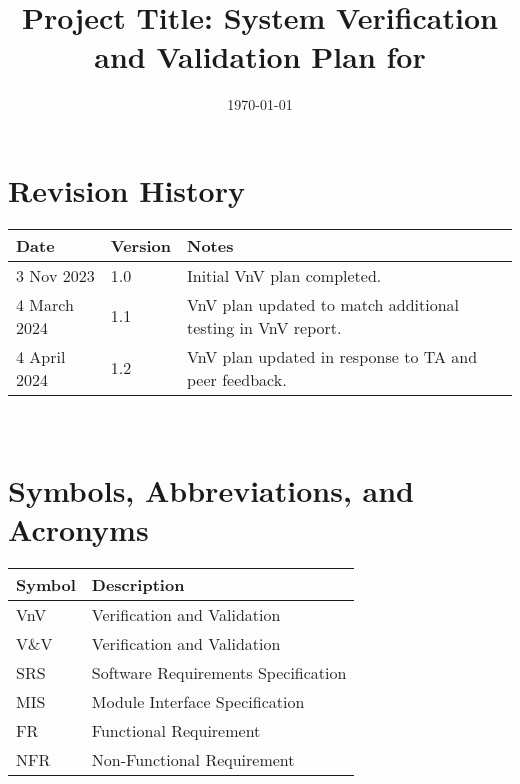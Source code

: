 \documentclass[12pt, titlepage]{article}
\begin{document}
\title{Project Title: System Verification and Validation Plan for \progname{}} 
\author{\authname}
\date{\today}
	
\maketitle


\section*{Revision History}

\begin{tabularx}{\textwidth}{p{3cm}p{2cm}X}
\toprule {\bf Date} & {\bf Version} & {\bf Notes}\\
\midrule
3 Nov 2023 & 1.0 & Initial VnV plan completed. \\
4 March 2024 & 1.1 & VnV plan updated to match additional testing in VnV report. \\
4 April 2024 & 1.2 & VnV plan updated in response to TA and peer feedback. \\
\bottomrule
\end{tabularx}

~\\

\newpage

\tableofcontents

\listoftables

\newpage

\section{Symbols, Abbreviations, and Acronyms}

\renewcommand{\arraystretch}{1.2}
\begin{tabular}[H]{l l}
  \toprule		
  \textbf{Symbol} & \textbf{Description}\\
  \midrule 
  VnV & Verification and Validation\\
  V\&V & Verification and Validation\\
  SRS & Software Requirements Specification\\
  MIS & Module Interface Specification \\
  FR & Functional Requirement \\
  NFR & Non-Functional Requirement \\
  \bottomrule
\end{tabular}\\
\end{document}
